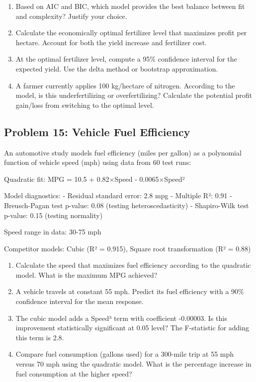 \documentclass[12pt]{article}
\begin{document}
\begin{enumerate}[label=(\alph*)]
\item Based on AIC and BIC, which model provides the best balance between fit and complexity? Justify your choice.

\item Calculate the economically optimal fertilizer level that maximizes profit per hectare. Account for both the yield increase and fertilizer cost.

\item At the optimal fertilizer level, compute a 95\% confidence interval for the expected yield. Use the delta method or bootstrap approximation.

\item A farmer currently applies 100 kg/hectare of nitrogen. According to the model, is this underfertilizing or overfertilizing? Calculate the potential profit gain/loss from switching to the optimal level.
\end{enumerate}

\subsection*{Problem 15: Vehicle Fuel Efficiency}

An automotive study models fuel efficiency (miles per gallon) as a polynomial function of vehicle speed (mph) using data from 60 test runs:

Quadratic fit: MPG = 10.5 + 0.82×Speed - 0.0065×Speed²

Model diagnostics:
- Residual standard error: 2.8 mpg
- Multiple R²: 0.91
- Breusch-Pagan test p-value: 0.08 (testing heteroscedasticity)
- Shapiro-Wilk test p-value: 0.15 (testing normality)

Speed range in data: 30-75 mph

Competitor models: Cubic (R² = 0.915), Square root transformation (R² = 0.88)

\begin{enumerate}[label=(\alph*)]
\item Calculate the speed that maximizes fuel efficiency according to the quadratic model. What is the maximum MPG achieved?

\item A vehicle travels at constant 55 mph. Predict its fuel efficiency with a 90\% confidence interval for the mean response.

\item The cubic model adds a Speed³ term with coefficient -0.00003. Is this improvement statistically significant at 0.05 level? The F-statistic for adding this term is 2.8.

\item Compare fuel consumption (gallons used) for a 300-mile trip at 55 mph versus 70 mph using the quadratic model. What is the percentage increase in fuel consumption at the higher speed?
\end{enumerate}
\end{document}
